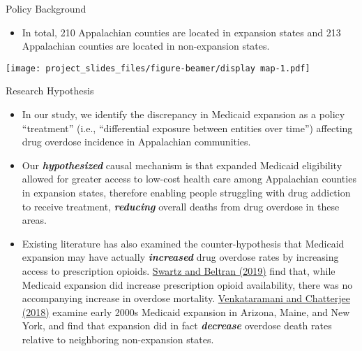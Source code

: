 \documentclass[
  ignorenonframetext,
]{beamer}
\providecommand{\tightlist}{%
  \setlength{\itemsep}{0pt}\setlength{\parskip}{0pt}}
\begin{document}
\begin{frame}{Policy Background}
\protect\hypertarget{policy-background-1}{}
\begin{itemize}
\tightlist
\item
  In total, 210 Appalachian counties are located in expansion states and
  213 Appalachian counties are located in non-expansion states.
\end{itemize}

\texttt{[image: project\_slides\_files/figure-beamer/display map-1.pdf]}
\end{frame}

\begin{frame}{Research Hypothesis}
\protect\hypertarget{research-hypothesis}{}
\begin{itemize}
\tightlist
\item
  In our study, we identify the discrepancy in Medicaid expansion as a
  policy ``treatment'' (i.e., ``differential exposure between entities
  over time'') affecting drug overdose incidence in Appalachian
  communities.
\item
  Our \textbf{\emph{hypothesized}} causal mechanism is that expanded
  Medicaid eligibility allowed for greater access to low-cost health
  care among Appalachian counties in expansion states, therefore
  enabling people struggling with drug addiction to receive treatment,
  \textbf{\emph{reducing}} overall deaths from drug overdose in these
  areas.
\item
  Existing literature has also examined the counter-hypothesis that
  Medicaid expansion may have actually \textbf{\emph{increased}} drug
  overdose rates by increasing access to prescription opioids.
  \href{https://onlinelibrary.wiley.com/doi/epdf/10.1111/add.14741}{Swartz
  and Beltran (2019)} find that, while Medicaid expansion did increase
  prescription opioid availability, there was no accompanying increase
  in overdose mortality.
  \href{https://www.ncbi.nlm.nih.gov/pmc/articles/PMC6318168/}{Venkataramani
  and Chatterjee (2018)} examine early 2000s Medicaid expansion in
  Arizona, Maine, and New York, and find that expansion did in fact
  \textbf{\emph{decrease}} overdose death rates relative to neighboring
  non-expansion states.
\end{itemize}
\end{frame}
\end{document}
